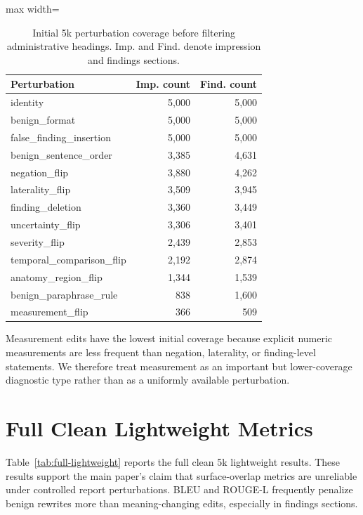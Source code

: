 \documentclass[11pt]{article}
\begin{document}
\begin{table}[H]
\centering
\scriptsize
\setlength{\tabcolsep}{3pt}
\begin{adjustbox}{max width=\columnwidth}
\begin{tabular}{lrr}
\toprule
\textbf{Perturbation} & \textbf{Imp. count} & \textbf{Find. count} \\
\midrule
identity & 5,000 & 5,000 \\
benign\_format & 5,000 & 5,000 \\
false\_finding\_insertion & 5,000 & 5,000 \\
benign\_sentence\_order & 3,385 & 4,631 \\
negation\_flip & 3,880 & 4,262 \\
laterality\_flip & 3,509 & 3,945 \\
finding\_deletion & 3,360 & 3,449 \\
uncertainty\_flip & 3,306 & 3,401 \\
severity\_flip & 2,439 & 2,853 \\
temporal\_comparison\_flip & 2,192 & 2,874 \\
anatomy\_region\_flip & 1,344 & 1,539 \\
benign\_paraphrase\_rule & 838 & 1,600 \\
measurement\_flip & 366 & 509 \\
\bottomrule
\end{tabular}
\end{adjustbox}
\caption{Initial 5k perturbation coverage before filtering administrative headings. Imp. and Find. denote impression and findings sections.}
\label{tab:coverage-initial}
\end{table}

Measurement edits have the lowest initial coverage because explicit numeric measurements are less frequent than negation, laterality, or finding-level statements. 
We therefore treat measurement as an important but lower-coverage diagnostic type rather than as a uniformly available perturbation.

\section{Full Clean Lightweight Metrics}
\label{app:lightweight}

Table~\ref{tab:full-lightweight} reports the full clean 5k lightweight results. 
These results support the main paper's claim that surface-overlap metrics are unreliable under controlled report perturbations. 
BLEU and ROUGE-L frequently penalize benign rewrites more than meaning-changing edits, especially in findings sections.
\end{document}
